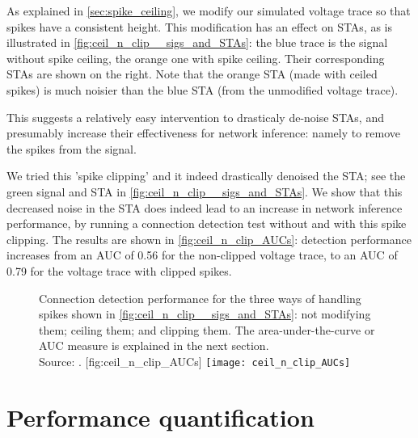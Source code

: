As explained in \cref{sec:spike_ceiling}, we modify our simulated voltage trace so that spikes have a consistent height. This modification has an effect on STAs, as is illustrated in \cref{fig:ceil_n_clip__sigs_and_STAs}: the blue trace is the signal without spike ceiling, the orange one with spike ceiling. Their corresponding STAs are shown on the right. Note that the orange STA (made with ceiled spikes) is much noisier than the blue STA (from the unmodified voltage trace).

This suggests a relatively easy intervention to drasticaly de-noise STAs, and presumably increase their effectiveness for network inference: namely to remove the spikes from the signal.

We tried this 'spike clipping' and it indeed drastically denoised the STA; see the green signal and STA in \cref{fig:ceil_n_clip__sigs_and_STAs}.
We show that this decreased noise in the STA does indeed lead to an increase in network inference performance, by running a connection detection test without and with this spike clipping. The results are shown in \cref{fig:ceil_n_clip_AUCs}: detection performance increases from an AUC of 0.56 for the non-clipped voltage trace, to an AUC of 0.79 for the voltage trace with clipped spikes.

\begin{figure}
    \begin{sidecaption}
        {
            Connection detection performance for the three ways of handling spikes shown in \cref{fig:ceil_n_clip__sigs_and_STAs}: not modifying them; ceiling them; and clipping them.
            The area-under-the-curve or AUC measure is explained in the next section.\\
            Source: .
        }
        [fig:ceil_n_clip_AUCs]
        \texttt{[image: ceil\_n\_clip\_AUCs]}
    \end{sidecaption}
\end{figure}
%


\FloatBarrier
\section{Performance quantification}
\label{sec:perf_quant}

